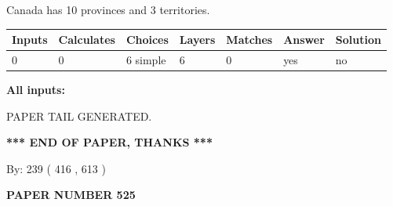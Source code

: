 \documentclass[12pt]{article}
\begin{document}
 
\noindent{}
 
 
Canada has 10  provinces and 3 territories.
 
 
\noindent{}
 
 
   
   
   
   
\noindent\begin{tabular}{|l|l|l|l|l|l|l|}
 \hline
Inputs & Calculates & Choices & Layers & Matches & Answer & Solution \\ \hline
 0  & 
 0  & 
 6
  simple  
  & 
 6  & 
 0  & 
  yes & 
  no 
  \\ \hline
 \end{tabular}
   
   
   
   
\noindent{}
   
   
   
   
\noindent\vspace{0.1in}\hspace{-0.08in} {\textbf{\Large{All inputs: }}}
   
   
   
   
   
   
 \vspace{0.2in}
 
   
   
\vspace{2.0in} PAPER TAIL GENERATED.
   
   
   
   
\vspace{1.0in} 
{\textbf{\large{ *** END OF PAPER, THANKS *** }}} 
   
   
\hspace{1.0in} By: 
 239 ( 416 ,  613 )
   
   
   
   
\newpage 
\setcounter{page}{ 
   525001 } 
   
   
   
   
 {\textbf{ \Large{ PAPER NUMBER  525  }}}
   
   
\vspace{0.2in}
   
   
   
\end{document}
